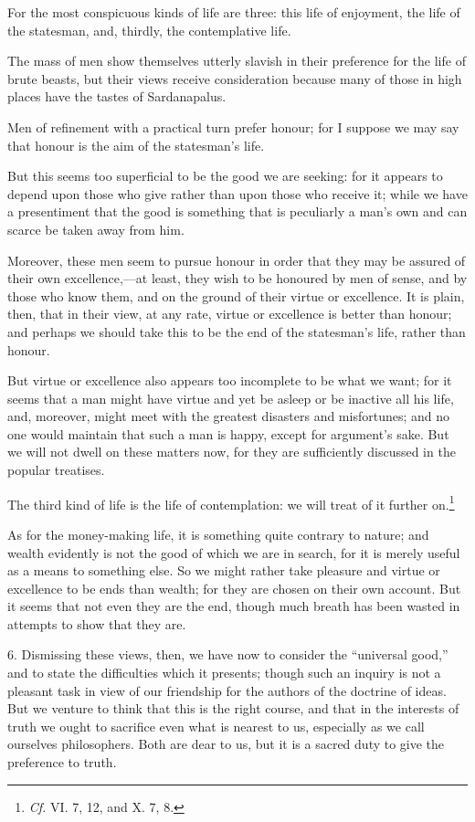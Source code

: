 For the most conspicuous kinds of life are three: this life of
enjoyment, the life of the statesman, and, thirdly, the contemplative
life.

The mass of men show themselves utterly slavish in their preference
for the life of brute beasts, but their views receive consideration
because many of those in high places have the tastes of Sardanapalus.

Men of refinement with a practical turn prefer honour; for I suppose
we may say that honour is the aim of the statesman's life.

But this seems too superficial to be the good we are seeking: for it
appears to depend upon those who give rather than upon those who
receive it; while we have a presentiment that the good is something
that is peculiarly a man's own and can scarce be taken away from him.

Moreover, these men seem to pursue honour in order that they may be
assured of their own excellence,---at least, they wish to be honoured by
men of sense, and by those who know them, and on the ground of their
virtue or excellence. It is plain, then, that in their view, at any
rate, virtue or excellence is better than honour; and perhaps we
should take this to be the end of the statesman's life, rather than
honour.

But virtue or excellence also appears too incomplete to be what we
want; for it seems that a man  might have virtue and yet be
asleep or be inactive all his life, and, moreover, might meet with the
greatest disasters and misfortunes; and no one would maintain that
such a man is happy, except for argument's sake. But we will not dwell
on these matters now, for they are sufficiently discussed in the
popular treatises.

The third kind of life is the life of contemplation: we will treat of
it further on.\footnote{\textit{Cf.} VI. 7, 12, and X. 7, 8.}

As for the money-making life, it is something quite contrary to
nature; and wealth evidently is not the good of which we are in
search, for it is merely useful as a means to something else. So we
might rather take pleasure and virtue or excellence to be ends than
wealth; for they are chosen on their own account. But it seems that
not even they are the end, though much breath has been wasted in
attempts to show that they are.

6. Dismissing these views, then, we have now to consider the
``universal good,'' and to state the difficulties which it presents;
though such an inquiry is not a pleasant task in view of our
friendship for the authors of the doctrine of ideas. But we venture to
think that this is the right course, and that in the interests of
truth we ought to sacrifice even what is nearest to us, especially as
we call ourselves philosophers. Both are dear to us, but it is a
sacred duty to give the preference to truth.

